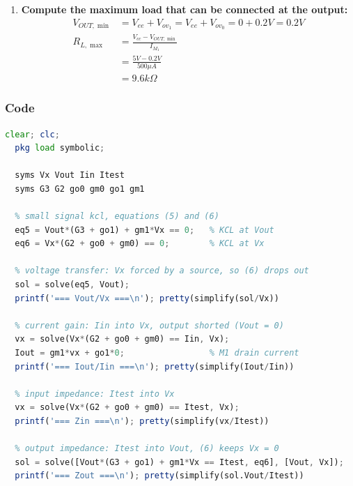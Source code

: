 \begin{enumerate}
    \(1 + K_{CLM} V_{DS}\) factor dropped in \(g_{o} \approx K_{CLM} I_D\)). Sizing \(W_0\) with
    \(K_{CLM} = 0\) also leaves \(I_{M_0}\) high by the factor \(1.024\) at \(V_{ov_0} = 0.2V\);
    for exactly \(100\,\mu A\), divide \(W_0\) and \(W_1\) by \(1.024\).
  \item \textbf{Compute the maximum load that can be connected
    at the output:}
    \begin{align*}
      V_{OUT,\min} &= V_{ee} + V_{ov_1} = V_{ee} + V_{ov_0} = 0 + 0.2V = 0.2V \\
      R_{L, \max} &= \frac{V_{cc} - V_{OUT,\min}}{I_{M_1}} \\
                   &= \frac{5V - 0.2V}{500 \mu A} \\
                   &= 9.6 k\Omega
    \end{align*}
\end{enumerate}

\subsubsection{Code}
\begin{lstlisting}[language=Octave]
  clear; clc;
  pkg load symbolic;

  syms Vx Vout Iin Itest
  syms G3 G2 go0 gm0 go1 gm1

  % small signal kcl, equations (5) and (6)
  eq5 = Vout*(G3 + go1) + gm1*Vx == 0;   % KCL at Vout
  eq6 = Vx*(G2 + go0 + gm0) == 0;        % KCL at Vx

  % voltage transfer: Vx forced by a source, so (6) drops out
  sol = solve(eq5, Vout);
  printf('=== Vout/Vx ===\n'); pretty(simplify(sol/Vx))

  % current gain: Iin into Vx, output shorted (Vout = 0)
  vx = solve(Vx*(G2 + go0 + gm0) == Iin, Vx);
  Iout = gm1*vx + go1*0;                 % M1 drain current
  printf('=== Iout/Iin ===\n'); pretty(simplify(Iout/Iin))

  % input impedance: Itest into Vx
  vx = solve(Vx*(G2 + go0 + gm0) == Itest, Vx);
  printf('=== Zin ===\n'); pretty(simplify(vx/Itest))

  % output impedance: Itest into Vout, (6) keeps Vx = 0
  sol = solve([Vout*(G3 + go1) + gm1*Vx == Itest, eq6], [Vout, Vx]);
  printf('=== Zout ===\n'); pretty(simplify(sol.Vout/Itest))
\end{lstlisting}
